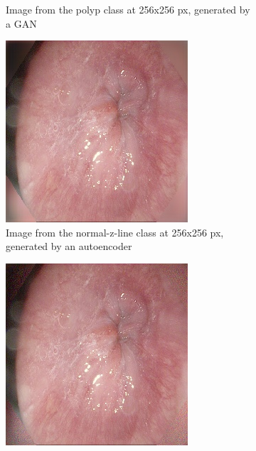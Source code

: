 \begin{figure}
\begin{subfigure}[t]{0.4\textwidth}
            \caption{Image from the polyp class at 256x256 px, generated by a GAN}    
            \label{fig:polyp_GAN_CORNER1}
        \end{subfigure}
        \qquad\vfill%
        \begin{subfigure}[t]{0.4\textwidth}   
            \centering 
            \includegraphics[width=\textwidth]{experiments/figures/blackcorner/zAE.jpg}
            \caption{Image from the normal-z-line class at 256x256 px, generated by an autoencoder }   
            \label{fig:z_AE_CORNER1}
        \end{subfigure}
        \qquad%
        \begin{subfigure}[t]{0.4\textwidth}   
            \centering 
            \includegraphics[width=\textwidth]{experiments/figures/blackcorner/zGAN.jpg}

\end{subfigure}
\end{figure}
